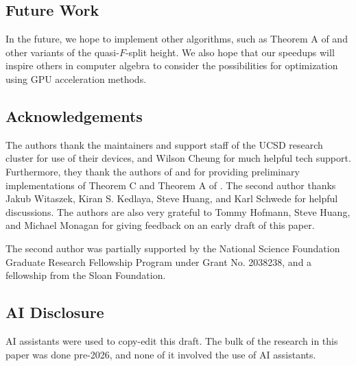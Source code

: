 \subsection{Future Work}

In the future, we hope to implement other algorithms, such as Theorem A of \cite{kty-2022-fedder}
and other variants of the quasi-\(F\)-split height.
We also hope that our speedups will inspire others in computer algebra to consider the possibilities
for optimization using GPU acceleration methods.

\subsection{Acknowledgements}

The authors thank the maintainers and support staff 
of the UCSD research cluster for use of their devices,
and Wilson Cheung for much helpful tech support.
Furthermore, they thank the authors of 
\cite{kty-2022-fedder} 
and \cite{fgmqt-2025-witt-vectors-macaulay2}
for providing preliminary implementations of 
Theorem C and Theorem A
of \cite{kty-2022-fedder}.
The second author thanks Jakub Witaszek, Kiran S. Kedlaya,
Steve Huang, and Karl Schwede for helpful discussions.
The authors are also very grateful to 
Tommy Hofmann, Steve Huang, and 
Michael Monagan for giving feedback on an early draft of
this paper.

The second author was partially supported by the 
National Science Foundation Graduate Research
Fellowship Program under Grant No. 2038238, and a fellowship
from the Sloan Foundation.

\subsection{AI Disclosure}

AI assistants were used to copy-edit this draft.
The bulk of the research in this paper was done pre-2026, and none of it involved the use of AI assistants.
